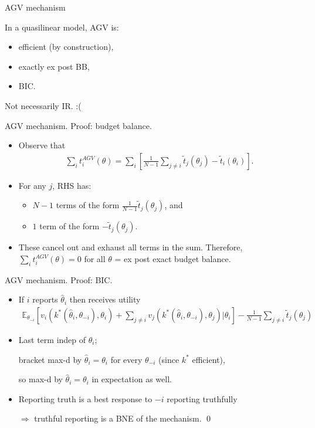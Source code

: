\documentclass[english,10pt
,aspectratio=169
]{beamer}
\begin{document}
\begin{frame}{AGV mechanism}
\begin{theorem}[AGV]
	In a \alert{quasilinear} model, AGV is:
	\begin{itemize}
		\item efficient (by construction),
		\item exactly ex post BB,
		\item BIC.
	\end{itemize}
\end{theorem}
Not necessarily IR. :(
\end{frame}


\begin{frame}{AGV mechanism. Proof: budget balance.}
\begin{itemize}
	\item Observe that
	\vspace{-0.5em}\begin{align*}
		\sum_i t_i^{AGV} (\theta) = \sum_i \left[ \frac{1}{N-1} \sum_{j \neq i} \tilde{t}_j (\theta_j) - \tilde{t}_i (\theta_i) \right].
	\end{align*}
	\item For any $j$, RHS has:
	\begin{itemize}
		\item $N-1$ terms of the form $\frac{1}{N-1} \tilde{t}_j (\theta_j)$, and
		\item $1$ term of the form $-\tilde{t}_j(\theta_j)$.
	\end{itemize}
	\item These cancel out and exhaust all terms in the sum. Therefore, $\sum_i t_i^{AGV} (\theta) = 0$ for all $\theta$ = ex post exact budget balance.
\end{itemize}
\end{frame}


\begin{frame}{AGV mechanism. Proof: BIC.}
\begin{itemize}
	\item If $i$ reports $\hat{\theta}_i$ then receives utility
	{\footnotesize 
		\vspace{-0.5em}\begin{align*}
			\mathbb{E}_{\theta_{-i}} \left[ v_i(k^*(\hat{\theta}_i, \theta_{-i}), \theta_i) + \sum_{j \neq i} v_j(k^*(\hat{\theta}_i, \theta_{-i}), \theta_j) | \theta_i \right] - \frac{1}{N-1} \sum_{j \neq i} \tilde{t}_j (\theta_j)
		\end{align*}
	}
	\item Last term indep of $\hat{\theta}_i$; 
	
	bracket max-d by $\hat{\theta}_i = \theta_i$ for every $\theta_{-i}$ (since $k^*$ efficient), 
	
	so max-d by $\hat{\theta}_i = \theta_i$ in expectation as well.
	
	\item Reporting truth is a best response to $-i$ reporting truthfully 
	
	$\Rightarrow$ truthful reporting is a BNE of the mechanism. \qed
\end{itemize}
\end{frame}
\end{document}
